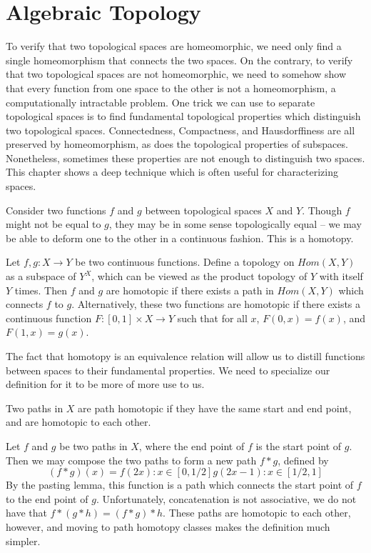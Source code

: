 \chapter{Algebraic Topology}

To verify that two topological spaces are homeomorphic, we need only find a single homeomorphism that connects the two spaces. On the contrary, to verify that two topological spaces are not homeomorphic, we need to somehow show that every function from one space to the other is not a homeomorphism, a computationally intractable problem. One trick we can use to separate topological spaces is to find fundamental topological properties which distinguish two topological spaces. Connectedness, Compactness, and Hausdorffiness are all preserved by homeomorphism, as does the topological properties of subspaces. Nonetheless, sometimes these properties are not enough to distinguish two spaces. This chapter shows a deep technique which is often useful for characterizing spaces.

Consider two functions $f$ and $g$ between topological spaces $X$ and $Y$. Though $f$ might not be equal to $g$, they may be in some sense topologically equal -- we may be able to deform one to the other in a continuous fashion. This is a homotopy.

\begin{definition}
    Let $f,g: X \to Y$ be two continuous functions. Define a topology on $Hom(X,Y)$ as a subspace of $Y^X$, which can be viewed as the product topology of $Y$ with itself $Y$ times. Then $f$ and $g$ are homotopic if there exists a path in $Hom(X,Y)$ which connects $f$ to $g$. Alternatively, these two functions are homotopic if there exists a continuous function $F:[0,1] \times X \to Y$ such that for all $x$, $F(0,x) = f(x)$, and $F(1,x) = g(x)$.
\end{definition}

The fact that homotopy is an equivalence relation will allow us to distill functions between spaces to their fundamental properties. We need to specialize our definition for it to be more of more use to us.

\begin{definition}
    Two paths in $X$ are path homotopic if they have the same start and end point, and are homotopic to each other.
\end{definition}

Let $f$ and $g$ be two paths in $X$, where the end point of $f$ is the start point of $g$. Then we may compose the two paths to form a new path $f * g$, defined by
%
\[ (f * g)(x) = f(2x): x \in [0,1/2]
                g(2x - 1): x \in [1/2,1] \]
%
By the pasting lemma, this function is a path which connects the start point of $f$ to the end point of $g$. Unfortunately, concatenation is not associative, we do not have that $f * (g * h) = (f * g) * h$. These paths are homotopic to each other, however, and moving to path homotopy classes makes the definition much simpler.

